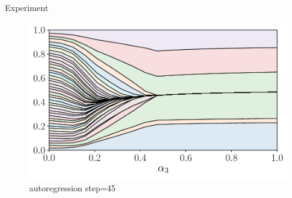 \documentclass[9pt]{beamer}
\begin{document}
\begin{frame}{Experiment}
\begin{figure}
	\includegraphics[width=\linewidth]{figs/features_vs_alpha_ecog_45.pdf}
	\caption{autoregression step=45}
\end{figure}
\end{frame}
\end{document}
